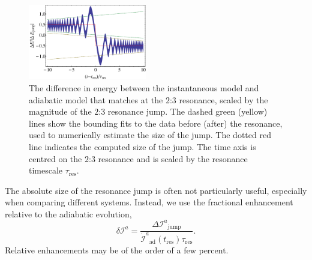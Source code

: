\documentclass[aps,prd,amsfonts,amssymb,amsmath,nofootinbib,showpacs,superscriptaddress,twocolumn,floatfix]{revtex4-1}
\newcommand{\sub}[1]{\ensuremath{_\mathrm{#1}}}
\begin{document}

\begin{figure}
\centering
\includegraphics[width=0.46\textwidth]{Fig_res_jump_calc}
\caption{\label{fig:res-jump-calc}The difference in energy between the instantaneous model and adiabatic model that matches at the $2$:$3$ resonance, scaled by the magnitude of the $2$:$3$ resonance jump. The dashed green (yellow) lines show the bounding fits to the data before (after) the resonance, used to numerically estimate the size of the jump. The dotted red line indicates the computed size of the jump. The time axis is centred on the $2$:$3$ resonance and is scaled by the resonance timescale $\tau\sub{res}$.}
\end{figure}

The absolute size of the resonance jump is often not particularly useful, especially when comparing different systems. Instead, we use the fractional enhancement relative to the adiabatic evolution,
\begin{equation}
\label{eq:res-jump-ratio}
\delta \mathcal{I}^a = \frac{\Delta \mathcal{I}^a\sub{jump}}{\dot{\mathcal{I}}^a\sub{ad}(t\sub{res})\tau\sub{res}}.
\end{equation}
Relative enhancements may be of the order of a few percent.
\end{document}
